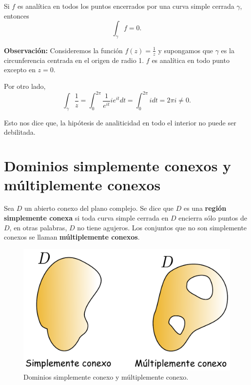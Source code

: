 \begin{teorema}
Si $f$ es analítica en todos los puntos encerrados por una curva simple cerrada $\gamma$, entonces
$$\int_{\gamma} f = 0.$$
\end{teorema}

\textbf{Observación:} Consideremos la función $f(z) = \frac{1}{z}$ y supongamos que $\gamma$ es la circunferencia centrada en el origen de radio 1. $f$ es analítica en todo punto excepto en $z = 0$.

Por otro lado,
\begin{equation}
 \int_{\gamma} \frac{1}{z} = \int_0^{2\pi} \frac{1}{e^{it}} i e^{it} dt = \int_0^{2\pi} i  dt = 2\pi i \neq 0. \label{PreTIC}  
\end{equation}

Esto nos dice que, la hipótesis de analiticidad en todo el interior no puede ser debilitada.

\section{Dominios simplemente conexos y múltiplemente conexos}

\begin{defi}
Sea $D$ un abierto conexo del plano complejo. Se dice que $D$ es una \textbf{región simplemente conexa} si toda curva simple cerrada en $D$ encierra sólo puntos de $D$, en otras palabras, $D$ no tiene agujeros. Los conjuntos que no son simplemente conexos se llaman \textbf{múltiplemente conexos}.
\end{defi}

\begin{figure}[H]
    \centering
    \includegraphics[scale = 0.5]{Figuras/SimplementeConexo.pdf}
    \caption{Dominios simplemente conexo y múltiplemente conexo.}
    \label{fig:SimConexo}
\end{figure}

